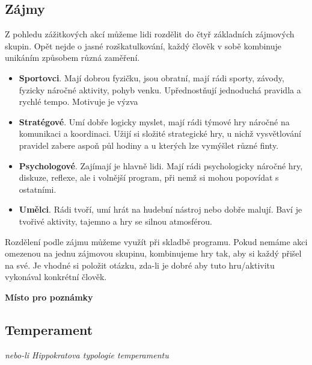 \documentclass[a4paper,12pt]{report}
\begin{document}
\begin{samepage}
\subsection*{Zájmy}
\pagelogos
Z pohledu zážitkových akcí můžeme lidi rozdělit do čtyř základních zájmových skupin. Opět nejde o jasné rozškatulkování, každý člověk v sobě kombinuje unikáním způsobem různá zaměření.

\begin{itemize}
 \item \textbf{Sportovci}. Mají dobrou fyzičku, jsou obratní, mají rádi sporty, závody, fyzicky náročné aktivity, pohyb venku. Upřednostňují jednoduchá pravidla a rychlé tempo. Motivuje je výzva
 
 \item \textbf{Stratégové}. Umí dobře logicky myslet, mají rádi týmové hry náročné na komunikaci a koordinaci. Užijí si složité strategické hry, u nichž vysvětlování pravidel zabere aspoň půl hodiny a u kterých lze vymýšlet různé finty.
 
 \item \textbf{Psychologové}. Zajímají je hlavně lidi. Mají rádi psychologicky náročné hry, diskuze, reflexe, ale i volnější program, při nemž si mohou popovídat s ostatními.
 
 \item \textbf{Umělci}. Rádi tvoří, umí hrát na hudební nástroj nebo dobře malují. Baví je tvořivé aktivity, tajemno a hry se silnou atmosférou.
\end{itemize}
\end{samepage}
Rozdělení podle zájmu můžeme využít při skladbě programu. Pokud nemáme akci omezenou  na jednu zájmovou skupinu, kombinujeme hry tak, aby si každý přišel na své. Je vhodné si položit otázku, zda-li je dobré aby tuto hru/aktivitu vykonával konkrétní člověk.

\begin{samepage}\begin{flushleft}
\end{flushleft}
\textbf{Místo pro poznámky}
\vspace{3cm}\pagelogos
\end{samepage}

\subsection*{Temperament} \textit{nebo-li Hippokratova typologie temperamentu}
\end{document}
